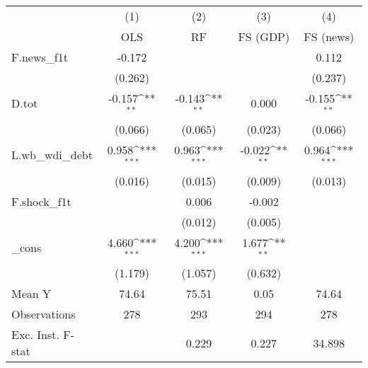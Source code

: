 {
\def\sym#1{\ifmmode^{#1}\else\(^{#1}\)\fi}
\begin{tabular}{l*{4}{c}}
\toprule
            &\multicolumn{1}{c}{(1)}&\multicolumn{1}{c}{(2)}&\multicolumn{1}{c}{(3)}&\multicolumn{1}{c}{(4)}\\
            &\multicolumn{1}{c}{OLS}&\multicolumn{1}{c}{RF}&\multicolumn{1}{c}{FS (GDP)}&\multicolumn{1}{c}{FS (news)}\\
\midrule
F.news\_f1t  &      -0.172         &                     &                     &       0.112         \\
            &     (0.262)         &                     &                     &     (0.237)         \\
\addlinespace
D.tot       &      -0.157\sym{**} &      -0.143\sym{**} &       0.000         &      -0.155\sym{**} \\
            &     (0.066)         &     (0.065)         &     (0.023)         &     (0.066)         \\
\addlinespace
L.wb\_wdi\_debt&       0.958\sym{***}&       0.963\sym{***}&      -0.022\sym{**} &       0.964\sym{***}\\
            &     (0.016)         &     (0.015)         &     (0.009)         &     (0.013)         \\
\addlinespace
F.shock\_f1t &                     &       0.006         &      -0.002         &                     \\
            &                     &     (0.012)         &     (0.005)         &                     \\
\addlinespace
\_cons      &       4.660\sym{***}&       4.200\sym{***}&       1.677\sym{**} &                     \\
            &     (1.179)         &     (1.057)         &     (0.632)         &                     \\
\midrule
Mean Y      &       74.64         &       75.51         &        0.05         &       74.64         \\
Observations&         278         &         293         &         294         &         278         \\
Exc. Inst. F-stat&                     &       0.229         &       0.227         &      34.898         \\
\bottomrule
\end{tabular}
}

